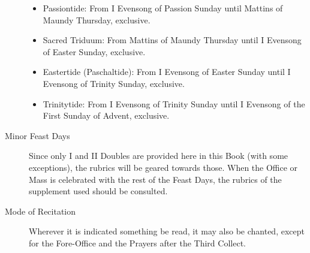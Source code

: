 \begin{description}
\begin{itemize}
        \item Passiontide: From I Evensong of Passion Sunday until Mattins of Maundy Thursday, exclusive.
        \item Sacred Triduum: From Mattins of Maundy Thursday until I Evensong of Easter Sunday, exclusive.
        \item Eastertide (Paschaltide): From I Evensong of Easter Sunday until I Evensong of Trinity Sunday, exclusive.
        \item Trinitytide: From I Evensong of Trinity Sunday until I Evensong of the First Sunday of Advent, exclusive.
    \end{itemize}
\item[Minor Feast Days] Since only I and II Doubles are provided here in this Book (with some exceptions), the rubrics will be geared towards those. When the Office or Mass is celebrated with the rest of the Feast Days, the rubrics of the supplement used should be consulted.%

\item[Mode of Recitation] Wherever it is indicated something be read, it may also be chanted, except for the Fore-Office and the Prayers after the Third Collect.
\end{description}
